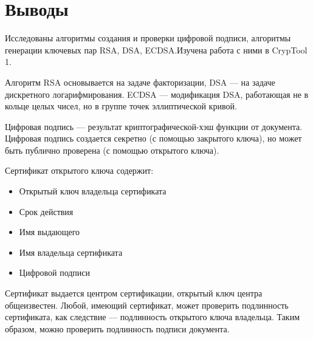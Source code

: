 \documentclass[a4paper, 14pt]{extarticle}
\begin{document}
\clearpage
\section{Выводы}
Исследованы алгоритмы создания и проверки цифровой подписи, алгоритмы генерации ключевых пар RSA, DSA, ECDSA.\@ Изучена работа с ними в CrypTool 1.

Алгоритм RSA основывается на задаче факторизации, DSA --- на задаче дискретного логарифмирования. ECDSA --- модификация DSA, работающая не в кольце целых чисел, но в группе точек эллиптической кривой.

Цифровая подпись --- результат криптографической-хэш функции от документа. Цифровая подпись создается секретно (с помощью закрытого ключа), но может быть публично проверена (с помощью открытого ключа).

Сертификат открытого ключа содержит:
\begin{itemize}
    \item Открытый ключ владельца сертификата
    \item Срок действия
    \item Имя выдающего
    \item Имя владельца сертификата
    \item Цифровой подписи\\
\end{itemize}

Сертификат выдается центром сертификации, открытый ключ центра общеизвестен. Любой, имеющий сертификат, может проверить подлинность сертификата, как следствие --- подлинность открытого ключа владельца. Таким образом, можно проверить подлинность подписи документа.
\end{document}

